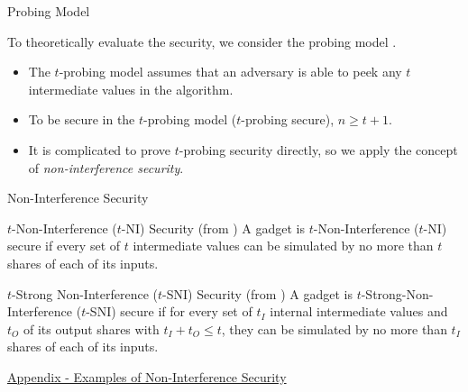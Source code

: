 \begin{frame}{Probing Model}

To theoretically evaluate the security, we consider the probing model \cite{C:IshSahWag03}.
\pause
\begin{itemize}
	\item The $t$-probing model assumes that an adversary is able to peek any $t$ intermediate values in the algorithm.
	\pause
	\item To be secure in the $t$-probing model ($t$-probing secure), $n \geq t+1$.
	\pause
	\item It is complicated to prove $t$-probing security directly, so we apply the concept of \emph{non-interference security}.
\end{itemize}

\end{frame}


\begin{frame}{Non-Interference Security}

\begin{definition}{$t$-Non-Interference ($t$-NI) Security (from \cite{CCS:BBDFGS16})}
A gadget is $t$-Non-Interference ($t$-NI) secure if every set of $t$ intermediate values can be simulated by no more than $t$ shares of each of its inputs.
\end{definition}
\medskip
\pause

\begin{definition}{$t$-Strong Non-Interference ($t$-SNI) Security (from \cite{CCS:BBDFGS16})}
A gadget is $t$-Strong-Non-Interference ($t$-SNI) secure if for every set of $t_I$ internal intermediate values and $t_O$ of its output shares with $t_I + t_O \leq t$, they can be simulated by no more than $t_I$ shares of each of its inputs.
\end{definition}
\medskip

\hyperlink{sec:appendix-tni}{\color{blue}Appendix - Examples of Non-Interference Security}

\end{frame}


